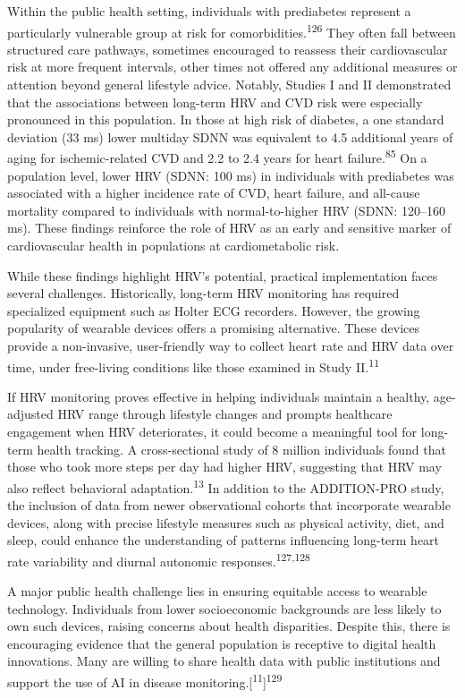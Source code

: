 \documentclass[
  letterpaper,
  headsepline=true,
  open=any]{scrbook}
\begin{document}
Within the public health setting, individuals with prediabetes represent
a particularly vulnerable group at risk for
comorbidities.\textsuperscript{126} They often fall between structured
care pathways, sometimes encouraged to reassess their cardiovascular
risk at more frequent intervals, other times not offered any additional
measures or attention beyond general lifestyle advice. Notably, Studies
I and II demonstrated that the associations between long-term HRV and
CVD risk were especially pronounced in this population. In those at high
risk of diabetes, a one standard deviation (33 ms) lower multiday SDNN
was equivalent to 4.5 additional years of aging for ischemic-related CVD
and 2.2 to 2.4 years for heart failure.\textsuperscript{85} On a
population level, lower HRV (SDNN: 100 ms) in individuals with
prediabetes was associated with a higher incidence rate of CVD, heart
failure, and all-cause mortality compared to individuals with
normal-to-higher HRV (SDNN: 120--160 ms). These findings reinforce the
role of HRV as an early and sensitive marker of cardiovascular health in
populations at cardiometabolic risk.

While these findings highlight HRV's potential, practical implementation
faces several challenges. Historically, long-term HRV monitoring has
required specialized equipment such as Holter ECG recorders. However,
the growing popularity of wearable devices offers a promising
alternative. These devices provide a non-invasive, user-friendly way to
collect heart rate and HRV data over time, under free-living conditions
like those examined in Study II.\textsuperscript{11}

If HRV monitoring proves effective in helping individuals maintain a
healthy, age-adjusted HRV range through lifestyle changes and prompts
healthcare engagement when HRV deteriorates, it could become a
meaningful tool for long-term health tracking. A cross-sectional study
of 8 million individuals found that those who took more steps per day
had higher HRV, suggesting that HRV may also reflect behavioral
adaptation.\textsuperscript{13} In addition to the ADDITION-PRO study,
the inclusion of data from newer observational cohorts that incorporate
wearable devices, along with precise lifestyle measures such as physical
activity, diet, and sleep, could enhance the understanding of patterns
influencing long-term heart rate variability and diurnal autonomic
responses.\textsuperscript{127,128}

A major public health challenge lies in ensuring equitable access to
wearable technology. Individuals from lower socioeconomic backgrounds
are less likely to own such devices, raising concerns about health
disparities. Despite this, there is encouraging evidence that the
general population is receptive to digital health innovations. Many are
willing to share health data with public institutions and support the
use of AI in disease
monitoring.{[}\textsuperscript{11}{]}\textsuperscript{129}
\end{document}
